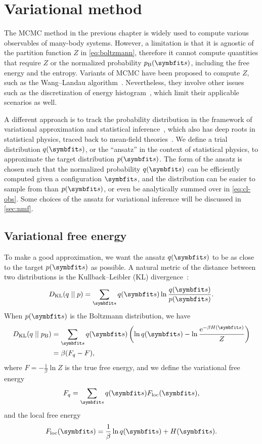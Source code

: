 \chapter{Variational method}
\label{ch:cl-var}

The MCMC method in the previous chapter is widely used to compute various observables of many-body systems. However, a limitation is that it is agnostic of the partition function $Z$ in \cref{eq:boltzmann}, therefore it cannot compute quantities that require $Z$ or the normalized probability $p_\text{B}(\vs)$, including the free energy and the entropy. Variants of MCMC have been proposed to compute $Z$, such as the Wang--Landau algorithm~\cite{wang2001efficient, landau2021guide5}. Nevertheless, they involve other issues such as the discretization of energy histogram~\cite{belardinelli2007wang}, which limit their applicable scenarios as well.

A different approach is to track the probability distribution in the framework of variational approximation and statistical inference~\cite{jordan1999introduction, mackay2003information}, which also has deep roots in statistical physics, traced back to mean-field theories~\cite{chaikin1995principles4, zdeborova2016statistical}. We define a trial distribution $q(\vs)$, or the ``ansatz'' in the context of statistical physics, to approximate the target distribution $p(\vs)$. The form of the ansatz is chosen such that the normalized probability $q(\vs)$ can be efficiently computed given a configuration $\vs$, and the distribution can be easier to sample from than $p(\vs)$, or even be analytically summed over in \cref{eq:cl-obs}. Some choices of the ansatz for variational inference will be discussed in \cref{sec:nmf}.

\section{Variational free energy}

To make a good approximation, we want the ansatz $q(\vs)$ to be as close to the target $p(\vs)$ as possible. A natural metric of the distance between two distributions is the Kullback--Leibler (KL) divergence~\cite{kullback1951information}:
\begin{equation}
D_\text{KL}(q \mid\mid p) = \sum_\vs q(\vs) \ln \frac{q(\vs)}{p(\vs)}.
\end{equation}
When $p(\vs)$ is the Boltzmann distribution, we have
\begin{align}
D_\text{KL}(q \mid\mid p_\text{B}) &= \sum_\vs q(\vs) \left( \ln q(\vs) - \ln \frac{\rme^{-\beta H(\vs)}}{Z} \right) \label{eq:kl} \\
&= \beta (F_q - F), \label{eq:kl-fq}
\end{align}
where $F = -\frac{1}{\beta} \ln Z$ is the true free energy, and we define the variational free energy
\begin{equation}
F_q = \sum_\vs q(\vs) F_\text{loc}(\vs),
\label{eq:fq}
\end{equation}
and the local free energy
\begin{equation}
F_\text{loc}(\vs) = \frac{1}{\beta} \ln q(\vs) + H(\vs).
\label{eq:fq-loc}
\end{equation}

